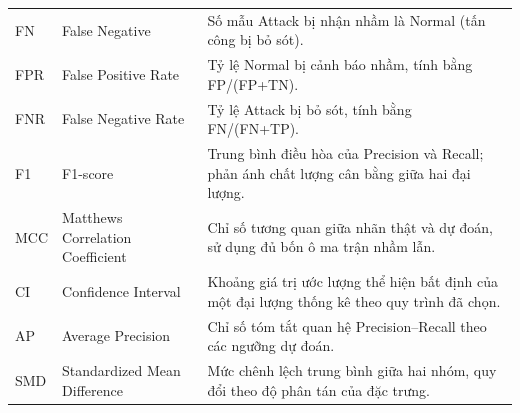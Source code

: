 \begin{longtable}{@{}p{.115\linewidth}p{.345\linewidth}p{.485\linewidth}@{}}
FN & False Negative & Số mẫu Attack bị nhận nhầm là Normal (tấn công bị bỏ sót).\\
FPR & False Positive Rate & Tỷ lệ Normal bị cảnh báo nhầm, tính bằng FP/(FP+TN).\\
FNR & False Negative Rate & Tỷ lệ Attack bị bỏ sót, tính bằng FN/(FN+TP).\\
F1 & F1-score & Trung bình điều hòa của Precision và Recall; phản ánh chất lượng cân bằng giữa hai đại lượng.\\
MCC & Matthews Correlation Coefficient & Chỉ số tương quan giữa nhãn thật và dự đoán, sử dụng đủ bốn ô ma trận nhầm lẫn.\\
CI & Confidence Interval & Khoảng giá trị ước lượng thể hiện bất định của một đại lượng thống kê theo quy trình đã chọn.\\
AP & Average Precision & Chỉ số tóm tắt quan hệ Precision--Recall theo các ngưỡng dự đoán.\\
SMD & Standardized Mean Difference & Mức chênh lệch trung bình giữa hai nhóm, quy đổi theo độ phân tán của đặc trưng.\\
\bottomrule
\end{longtable}
